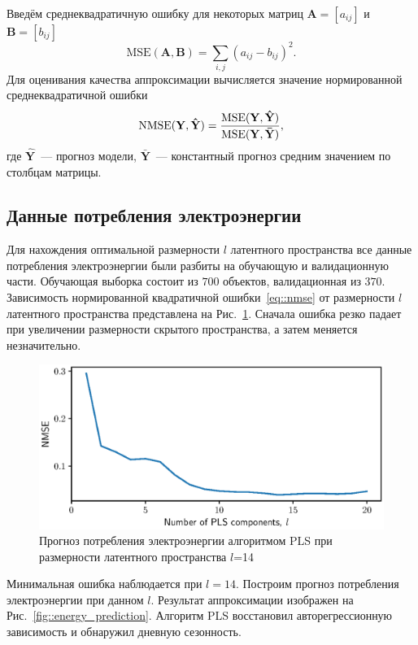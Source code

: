 Введём среднеквадратичную ошибку для некоторых матриц $\mathbf{A} = [a_{ij}]$ и $\mathbf{B} = [b_{ij}]$
\[
\text{MSE} (\mathbf{A}, \mathbf{B}) = \sum_{i,j} (a_{ij} - b_{ij})^2.
\]
Для оценивания качества аппроксимации вычисляется значение нормированной среднеквадратичной ошибки
\begin{equation}
\text{NMSE}(\mathbf{Y},  \mathbf{\hat{Y}}) = \frac{\text{MSE} (\mathbf{Y}, \mathbf{\hat{Y}})}{\text{MSE} (\mathbf{Y}, \mathbf{\bar{Y}})},
\label{eq::nmse}
\end{equation}
где $\mathbf{\hat{Y}}$~--- прогноз модели, $\mathbf{\bar{Y}}$~--- константный прогноз средним значением по столбцам матрицы.

\subsection{Данные потребления электроэнергии}

Для нахождения оптимальной размерности $l$ латентного пространства все данные потребления электроэнергии были разбиты на обучающую и валидационную части. 
Обучающая выборка состоит из $700$ объектов, валидационная из $370$. Зависимость нормированной квадратичной ошибки~\eqref{eq::nmse} от размерности $l$ латентного пространства представлена на Рис.~\ref{fig::energy_n_comp}. 
Сначала ошибка резко падает при увеличении размерности скрытого пространства, а затем меняется незначительно.

\begin{figure}[ht]
	\centering
	\includegraphics[width=0.75\linewidth]{figs/ch1/energy_n_comp}
	\caption{Прогноз потребления электроэнергии алгоритмом PLS при размерности латентного пространства $l$=14}
	\label{fig::energy_n_comp}
\end{figure}

Минимальная ошибка наблюдается при $l=14$. 
Построим прогноз потребления электроэнергии при данном $l$. 
Результат аппроксимации изображен на Рис.~\ref{fig::energy_prediction}. Алгоритм PLS восстановил авторегрессионную зависимость и обнаружил дневную сезонность.

